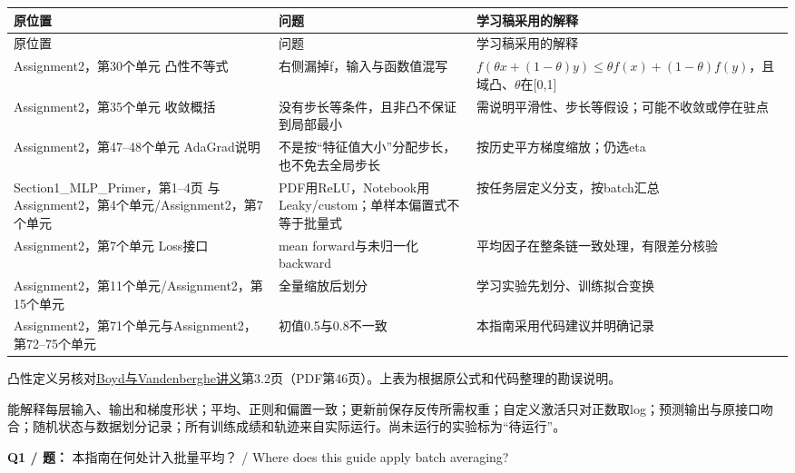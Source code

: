 \begingroup
\small\setlength{\tabcolsep}{3pt}
\renewcommand{\arraystretch}{1.22}
\begin{longtable}{@{}>{\raggedright\arraybackslash}p{}>{\raggedright\arraybackslash}p{}>{\raggedright\arraybackslash}p{}@{}}
\toprule
原位置 & 问题 & 学习稿采用的解释 \\
\midrule\endfirsthead
原位置 & 问题 & 学习稿采用的解释 \\
\midrule\endhead
\bottomrule\endfoot
Assignment2，第30个单元 凸性不等式 & 右侧漏掉f，输入与函数值混写 & \(f(\theta x+(1-\theta)y)\le\theta f(x)+(1-\theta)f(y)\)，且域凸、\ensuremath{\theta}在[0,1] \\
Assignment2，第35个单元 收敛概括 & 没有步长等条件，且非凸不保证到局部最小 & 需说明平滑性、步长等假设；可能不收敛或停在驻点 \\
Assignment2，第47–48个单元 AdaGrad说明 & 不是按“特征值大小”分配步长，也不免去全局步长 & 按历史平方梯度缩放；仍选eta \\
Section1\_MLP\_Primer，第1–4页 与Assignment2，第4个单元/Assignment2，第7个单元 & PDF用ReLU，Notebook用Leaky/custom；单样本偏置式不等于批量式 & 按任务层定义分支，按batch汇总 \\
Assignment2，第7个单元 Loss接口 & mean forward与未归一化backward & 平均因子在整条链一致处理，有限差分核验 \\
Assignment2，第11个单元/Assignment2，第15个单元 & 全量缩放后划分 & 学习实验先划分、训练拟合变换 \\
Assignment2，第71个单元与Assignment2，第72–75个单元 & 初值0.5与0.8不一致 & 本指南采用代码建议并明确记录 \\
\end{longtable}
\endgroup


凸性定义另核对\href{https://web.stanford.edu/\textasciitilde{}boyd/cvxbook/bv\_cvxslides.pdf}{Boyd与Vandenberghe讲义}第3.2页（PDF第46页）。上表为根据原公式和代码整理的勘误说明。





能解释每层输入、输出和梯度形状；平均、正则和偏置一致；更新前保存反传所需权重；自定义激活只对正数取log；预测输出与原接口吻合；随机状态与数据划分记录；所有训练成绩和轨迹来自实际运行。尚未运行的实验标为“待运行”。


\textbf{Q1 / 题：} 本指南在何处计入批量平均？ / Where does this guide apply batch averaging?

